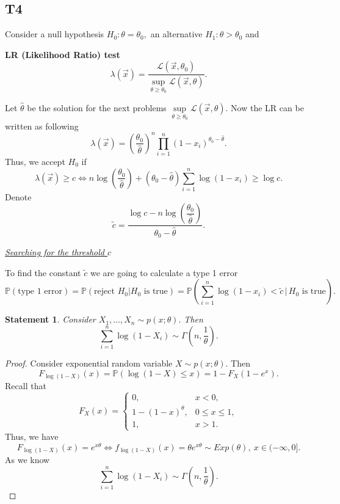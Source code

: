 \documentclass[a4paper, 12pt]{article}
\renewcommand*{\P}{\mathbb{P}}
\newtheorem{statement}{Statement}
\begin{document}
\subsection*{T4}
Consider a null hypothesis $H_0: \theta = \theta_0,$ an alternative $H_1: \theta > \theta_0$ and
\begin{tcolorbox}
[enhanced,width=\textwidth,center upper,
 fontupper=\large\bfseries,
 drop fuzzy shadow southeast,
 colframe=red!50!black,colback=yellow!25]
\textbf{\small LR (Likelihood Ratio) test}
$$
\lambda(\vec{x}) = \dfrac{\mathcal{L}(\vec{x}, \theta_0)}{\sup \limits_{\theta \geqslant \theta_0} \mathcal{L}(\vec{x}, \theta)}.
$$
\end{tcolorbox}
Let $\hat{\theta}$ be the solution for the next problems $\sup \limits_{\theta \geqslant \theta_0} \mathcal{L}(\vec{x}, \theta).$ Now the LR can be written as following
$$
\lambda(\vec{x}) = \left( \dfrac{\theta_0}{\hat{\theta}} \right)^n \prod \limits_{i=1}^n (1-x_i)^{\theta_0- \hat{\theta}}.
$$
Thus, we accept $H_0$ if 
$$
\lambda(\vec{x}) \geqslant c \Leftrightarrow n \log \left(\dfrac{\theta_0}{\hat{\theta}} \right) + (\theta_0 - \hat{\theta}) \sum \limits_{i=1}^n \log (1 - x_i) \geqslant \log c. 
$$
Denote $$
\widetilde{c} = \dfrac{ \log c - n \log \left(\dfrac{\theta_0}{\hat{\theta}} \right)}{\theta_0 - \hat{\theta}}.
$$
\begin{center}
\large \itshape \underline{Searching for the threshold $c$}
\end{center}
To find the constant $\widetilde{c}$ we are going to calculate a type 1 error
$$ 
\P(\text{type 1 error}) = \P (\text{reject } H_0| H_0 \text{ is true}) = \P \left( \sum \limits_{i=1}^n \log (1 - x_i) < \widetilde{c} \, | \, H_0 \text{ is true} \right).
$$
\begin{tcolorbox}
[enhanced,width=\textwidth,center upper,
 fontupper=\large\bfseries,
 drop fuzzy shadow southeast,
 colframe=red!50!black,colback=yellow!25]
\begin{statement}
Consider $X_1, \ldots, X_n \sim p(x;\theta).$ Then
$$
\sum \limits_{i=1}^n \log (1 - X_i) \sim \Gamma \left( n, \dfrac{1}{\theta} \right).
$$
\end{statement}
\end{tcolorbox}
\begin{proof}
Consider exponential random variable $X \sim p(x; \theta).$ Then
$$
F_{\log(1-X)}(x) = \P (\log(1 - X) \leqslant x) = 1 - F_X(1 - e^x).
$$
Recall that
$$
F_X(x) = 
\begin{cases}
0, & x < 0, \\
1 - (1 - x)^{\theta}, & 0 \leqslant x \leqslant 1, \\
1, & x > 1.
\end{cases}
$$
Thus, we have
$$
F_{\log(1-X)}(x) = e^{x \theta} \Leftrightarrow f_{\log(1-X)}(x) = \theta e^{x \theta} \sim Exp(\theta), ~ x \in ( -\infty, 0].
$$
As we know 
$$
\sum \limits_{i=1}^n \log (1 - X_i) \sim \Gamma \left( n, \dfrac{1}{\theta} \right).
$$
\end{proof}
\end{document}
